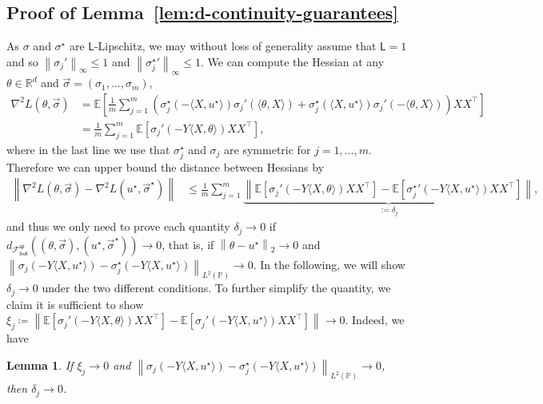 \documentclass[11pt]{article}
\newcommand{\E}{\mathbb{E}}
\newcommand{\Prb}{\mathbb{P}}
\newcommand{\R}{\mathbb{R}} %
\newcommand{\norm}[1]{\left\|{#1}\right\|} %
\newcommand{\lipconst}{\mathsf{L}}
\newcommand{\fsymlinksp}{\mathcal{F}_{\mathsf{link}}^{\mathsf{sp}}}
\newcommand{\ltwo}[1]{\norm{#1}_2} %
\newcommand{\linf}[1]{\norm{#1}_\infty} %
\newcommand{\<}{\langle} %
\renewcommand{\>}{\rangle}
\newcommand{\defeq}{\coloneqq}
\newcommand{\LtwoP}[1]{\norm{#1}_{L^2(\Prb)}}
\newcommand{\opt}{^\star}
\newtheorem{lemma}[claim]{Lemma}
\begin{document}
\subsection{Proof of Lemma~\ref{lem:d-continuity-guarantees}}
\label{proof:d-continuity-guarantees}

As $\sigma$ and $\sigma\opt$ are $\lipconst$-Lipschitz, we may without loss
of generality assume that $\lipconst = 1$ and so $\linf{\sigma_j'} \le 1$
and $\linf{{\sigma\opt_j}'} \le 1$.  We can compute the Hessian at any
$\theta \in \R^d$ and $\vec{\sigma} = (\sigma_1, \dots, \sigma_m)$,
\begin{align*}
  \nabla^2 L(\theta, \vec{\sigma}) & = \E\left[\frac{1}{m}
    \sum_{j = 1}^m \left(\sigma\opt_j(-\<X, u\opt\>) \sigma_j'(\<\theta, X\>)
    + \sigma\opt_j(\<X, u\opt\>) \sigma_j'(-\<\theta, X\>)\right) X X^\top \right] \\
  & = \frac{1}{m} \sum_{j = 1}^m \E\left[\sigma_j'(-Y\<X, \theta\>) XX^\top\right],
\end{align*}
where in the last line we use that $\sigma_j\opt$ and $\sigma_j$ are symmetric for $j=1,\dots, m$. Therefore we can upper bound the distance between Hessians by
\begin{align*}
	\norm{\nabla^2 L(\theta, \vec{\sigma}) - \nabla^2 L(u\opt, \vec{\sigma}\opt)} & \leq \frac{1}{m} \sum_{j = 1}^m \underbrace{\norm{\E\left[\sigma_j'(-Y\<X, \theta\>) XX^\top\right] - \E\left[{\sigma_j\opt}'(-Y\<X, u\opt\>) XX^\top\right]  }}_{:=\delta_j},
\end{align*}
and thus we only need to prove each quantity $\delta_j \to 0$ if
$d_{\fsymlinksp}((\theta, \vec{\sigma}), (u\opt, \vec{\sigma}\opt)) \to 0$,
that is, if $\ltwo{\theta - u\opt} \to 0$ and $\LtwoP{\sigma_j(-Y\<X,
  u\opt\>) - \sigma_j\opt(-Y\<X, u\opt\>)} \to 0$. In the following, we will
show $\delta_j \to 0$ under the two different conditions. To further
simplify the quantity, we claim it is sufficient to show $\xi_j \defeq
\norm{\E[\sigma_j'(-Y\<X, \theta\>) XX^\top] -
  \E[\sigma_j'(-Y\<X, u\opt\>) XX^\top]} \to 0$. Indeed, we have
\begin{lemma}
  If $\xi_j \to 0$ and $\LtwoP{\sigma_j(-Y\<X, u\opt\>) -
    \sigma_j\opt(-Y\<X, u\opt\>)} \to 0$, then $\delta_j \to 0$.
\end{lemma}
\end{document}
